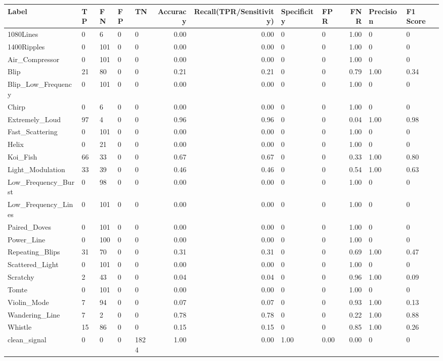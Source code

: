 \begin{tabular}{lllllrrllrll}
\toprule
Label & TP & FN & FP & TN & Accuracy & Recall(TPR/Sensitivity) & Specificity & FPR & FNR & Precision & F1 Score \\
\midrule
1080Lines & 0 & 6 & 0 & 0 & 0.00 & 0.00 & 0 & 0 & 1.00 & 0 & 0 \\
1400Ripples & 0 & 101 & 0 & 0 & 0.00 & 0.00 & 0 & 0 & 1.00 & 0 & 0 \\
Air_Compressor & 0 & 101 & 0 & 0 & 0.00 & 0.00 & 0 & 0 & 1.00 & 0 & 0 \\
Blip & 21 & 80 & 0 & 0 & 0.21 & 0.21 & 0 & 0 & 0.79 & 1.00 & 0.34 \\
Blip_Low_Frequency & 0 & 101 & 0 & 0 & 0.00 & 0.00 & 0 & 0 & 1.00 & 0 & 0 \\
Chirp & 0 & 6 & 0 & 0 & 0.00 & 0.00 & 0 & 0 & 1.00 & 0 & 0 \\
Extremely_Loud & 97 & 4 & 0 & 0 & 0.96 & 0.96 & 0 & 0 & 0.04 & 1.00 & 0.98 \\
Fast_Scattering & 0 & 101 & 0 & 0 & 0.00 & 0.00 & 0 & 0 & 1.00 & 0 & 0 \\
Helix & 0 & 21 & 0 & 0 & 0.00 & 0.00 & 0 & 0 & 1.00 & 0 & 0 \\
Koi_Fish & 66 & 33 & 0 & 0 & 0.67 & 0.67 & 0 & 0 & 0.33 & 1.00 & 0.80 \\
Light_Modulation & 33 & 39 & 0 & 0 & 0.46 & 0.46 & 0 & 0 & 0.54 & 1.00 & 0.63 \\
Low_Frequency_Burst & 0 & 98 & 0 & 0 & 0.00 & 0.00 & 0 & 0 & 1.00 & 0 & 0 \\
Low_Frequency_Lines & 0 & 101 & 0 & 0 & 0.00 & 0.00 & 0 & 0 & 1.00 & 0 & 0 \\
Paired_Doves & 0 & 101 & 0 & 0 & 0.00 & 0.00 & 0 & 0 & 1.00 & 0 & 0 \\
Power_Line & 0 & 100 & 0 & 0 & 0.00 & 0.00 & 0 & 0 & 1.00 & 0 & 0 \\
Repeating_Blips & 31 & 70 & 0 & 0 & 0.31 & 0.31 & 0 & 0 & 0.69 & 1.00 & 0.47 \\
Scattered_Light & 0 & 101 & 0 & 0 & 0.00 & 0.00 & 0 & 0 & 1.00 & 0 & 0 \\
Scratchy & 2 & 43 & 0 & 0 & 0.04 & 0.04 & 0 & 0 & 0.96 & 1.00 & 0.09 \\
Tomte & 0 & 101 & 0 & 0 & 0.00 & 0.00 & 0 & 0 & 1.00 & 0 & 0 \\
Violin_Mode & 7 & 94 & 0 & 0 & 0.07 & 0.07 & 0 & 0 & 0.93 & 1.00 & 0.13 \\
Wandering_Line & 7 & 2 & 0 & 0 & 0.78 & 0.78 & 0 & 0 & 0.22 & 1.00 & 0.88 \\
Whistle & 15 & 86 & 0 & 0 & 0.15 & 0.15 & 0 & 0 & 0.85 & 1.00 & 0.26 \\
clean_signal & 0 & 0 & 0 & 1824 & 1.00 & 0.00 & 1.00 & 0.00 & 0.00 & 0 & 0 \\
\bottomrule
\end{tabular}
